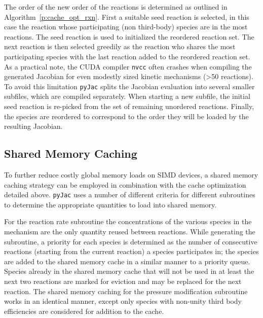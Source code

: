 \documentclass[preprint,12pt]{elsarticle}
\begin{document}
{The order of the new order of the reactions is determined as outlined in Algorithm~\eqref{p:cache_opt_rxn}.
First a suitable seed reaction is selected, in this case the reaction whose participating (non third-body) species are in the most reactions.
The seed reaction is used to initialized the reordered reaction set.
The next reaction is then selected greedily as the reaction who shares the most participating species with the last reaction added to the reordered reaction set.
As a practical note, the CUDA compiler \texttt{nvcc} often crashes when compiling the generated Jacobian for even modestly sized kinetic mechanisms (>50 reactions).
To avoid this limitation \texttt{pyJac} splits the Jacobian evaluation into several smaller subfiles, which are compiled separately.
When starting a new subfile, the initial seed reaction is re-picked from the set of remaining unordered reactions.
Finally, the species are reordered to correspond to the order they will be loaded by the resulting Jacobian.

\subsection{Shared Memory Caching}
To further reduce costly global memory loads on SIMD devices, a shared memory caching strategy can be employed in combination with the cache optimization detailed above.
\texttt{pyJac} uses a number of different criteria for different subroutines to determine the appropriate quantities to load into shared memory.

For the reaction rate subroutine the concentrations of the various species in the mechanism are the only quantity reused between reactions.
While generating the subroutine, a priority for each species is determined as the number of consecutive reactions (starting from the current reaction) a species participates in; the species are added to the shared memory cache in a similar manner to a priority queue.
Species already in the shared memory cache that will not be used in at least the next two reactions are marked for eviction and may be replaced for the next reaction.
The shared memory caching for the pressure modification subroutine works in an identical manner, except only species with non-unity third body efficiencies are considered for addition to the cache.

}
\end{document}
